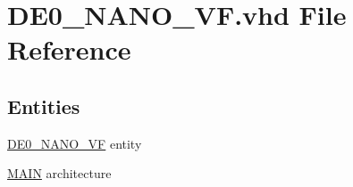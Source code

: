 \hypertarget{_d_e0___n_a_n_o___v_f_8vhd}{}\section{D\+E0\+\_\+\+N\+A\+N\+O\+\_\+\+V\+F.\+vhd File Reference}
\label{_d_e0___n_a_n_o___v_f_8vhd}
\subsection*{Entities}
\begin{DoxyCompactItemize}
\item 
\hyperlink{class_d_e0___n_a_n_o___v_f}{D\+E0\+\_\+\+N\+A\+N\+O\+\_\+\+V\+F} entity
\item 
\hyperlink{class_d_e0___n_a_n_o___v_f_1_1_m_a_i_n}{M\+A\+I\+N} architecture
\end{DoxyCompactItemize}
